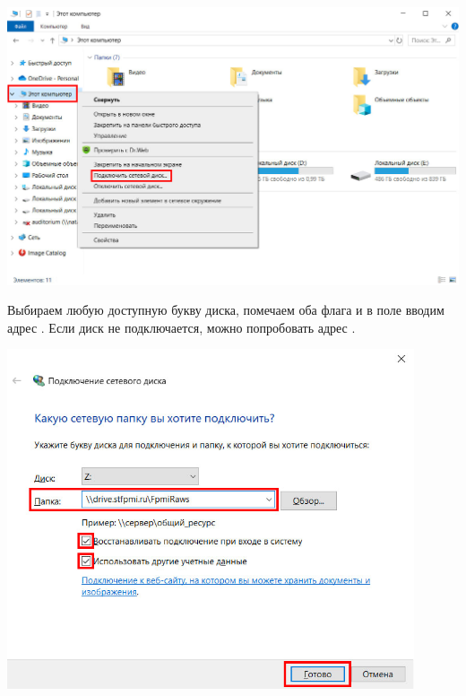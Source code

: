 \begin{center}
  \begin{minipage}[c]{\textwidth - \fboxaddlen}
    \centering
    \includegraphics[width={\textwidth - \fboxaddlen},fbox]{Images/CloudStorage/windows/connect-network-drive.jpg}
  \end{minipage}
\end{center}

Выбираем любую доступную букву диска, помечаем оба флага и в поле  вводим адрес . Если диск не подключается, можно попробовать адрес .

\begin{center}
  \begin{minipage}[c]{0.9\textwidth}
    \centering
    \includegraphics[width=0.9\textwidth,fbox]{Images/CloudStorage/windows/input-folder.jpg}
  \end{minipage}
\end{center}

